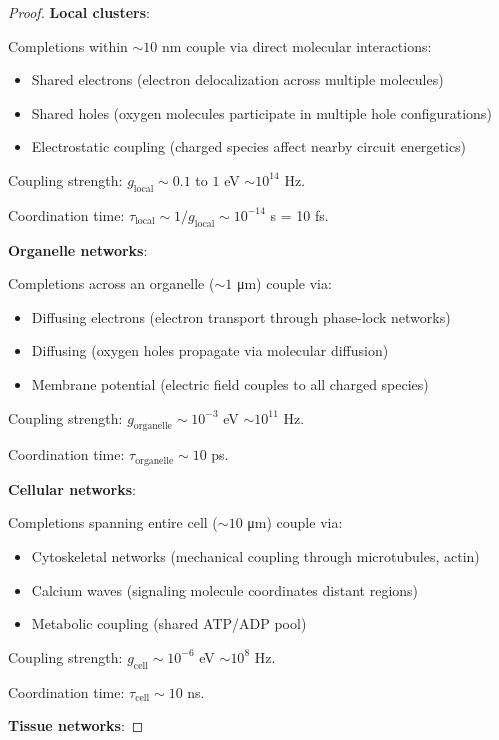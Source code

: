 \documentclass[12pt,a4paper]{article}
\begin{document}
\begin{proof}
\textbf{Local clusters}:

Completions within $\sim 10$ nm couple via direct molecular interactions:
\begin{itemize}
\item Shared electrons (electron delocalization across multiple molecules)
\item Shared holes (oxygen molecules participate in multiple hole configurations)
\item Electrostatic coupling (charged species affect nearby circuit energetics)
\end{itemize}

Coupling strength: $g_{\text{local}} \sim 0.1$ to $1$ eV $\sim 10^{14}$ Hz.

Coordination time: $\tau_{\text{local}} \sim 1/g_{\text{local}} \sim 10^{-14}$ s = 10 fs.

\textbf{Organelle networks}:

Completions across an organelle ($\sim 1$ μm) couple via:
\begin{itemize}
\item Diffusing electrons (electron transport through phase-lock networks)
\item Diffusing  (oxygen holes propagate via molecular diffusion)
\item Membrane potential (electric field couples to all charged species)
\end{itemize}

Coupling strength: $g_{\text{organelle}} \sim 10^{-3}$ eV $\sim 10^{11}$ Hz.

Coordination time: $\tau_{\text{organelle}} \sim 10$ ps.

\textbf{Cellular networks}:

Completions spanning entire cell ($\sim 10$ μm) couple via:
\begin{itemize}
\item Cytoskeletal networks (mechanical coupling through microtubules, actin)
\item Calcium waves (signaling molecule coordinates distant regions)
\item Metabolic coupling (shared ATP/ADP pool)
\end{itemize}

Coupling strength: $g_{\text{cell}} \sim 10^{-6}$ eV $\sim 10^{8}$ Hz.

Coordination time: $\tau_{\text{cell}} \sim 10$ ns.

\textbf{Tissue networks}:


\end{proof}
\end{document}
